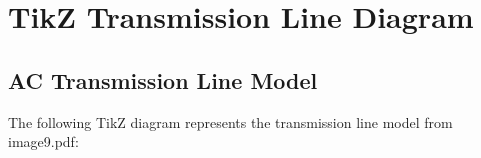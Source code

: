 \documentclass[11pt,a4paper]{article}
\begin{document}

\appendix

\chapter{TikZ Transmission Line Diagram}

\section{AC Transmission Line Model}

The following TikZ diagram represents the transmission line model from image9.pdf:
\end{document}

